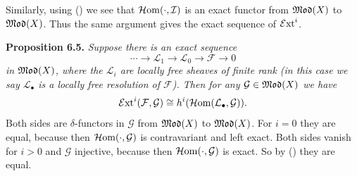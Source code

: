 {Similarly, using () we see that $\operatorname{\mathcal H om}(\cdot,\mathcal I)$ is an exact functor from $\operatorname{\mathfrak{Mod}}(X)$ to $\operatorname{\mathfrak{Mod}}(X)$. Thus the same argument gives the exact sequence of $\operatorname{\mathcal E xt}^i$.

\medskip
\noindent\hypertarget{result-III-6.5}{}\hypertarget{result-III-6.5A}{}\textbf{Proposition 6.5.} \emph{Suppose there is an exact sequence}
\[
\cdots\longrightarrow\mathcal L_1\longrightarrow\mathcal L_0\longrightarrow\mathcal F\longrightarrow0
\]
\noindent\emph{in $\operatorname{\mathfrak{Mod}}(X)$, where the $\mathcal L_i$ are locally free sheaves of finite rank (in this case we say $\mathcal L_\bullet$ is a locally free resolution of $\mathcal F$). Then for any $\mathcal G\in\operatorname{\mathfrak{Mod}}(X)$ we have}
\[
\operatorname{\mathcal E xt}^i(\mathcal F,\mathcal G)\cong h^i(\operatorname{\mathcal H om}(\mathcal L_\bullet,\mathcal G)).
\]
\Proof Both sides are $\delta$-functors in $\mathcal G$ from $\operatorname{\mathfrak{Mod}}(X)$ to $\operatorname{\mathfrak{Mod}}(X)$. For $i=0$ they are equal, because then $\operatorname{\mathcal H om}(\cdot,\mathcal G)$ is contravariant and left exact. Both sides vanish for $i>0$ and $\mathcal G$ injective, because then $\operatorname{\mathcal H om}(\cdot,\mathcal G)$ is exact. So by () they are equal.
}

